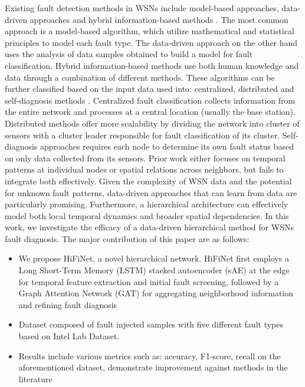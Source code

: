 Existing fault detection methods in WSNs include model-based approaches, data-driven approaches and hybrid information-based methods \cite{Shi2024}. The most common approach is a model-based algorithm, which utilize mathematical and statistical principles to model each fault type. The data-driven approach on the other hand uses the analysis of data samples obtained to build a model for fault classification. Hybrid information-based methods use both human knowledge and data through a combination of different methods. These algorithms can be further classified based on the input data used into: centralized, distributed and self-diagnosis methods \cite{Prasad2023, Takele2024}. Centralized fault classification collects information from the entire network and processes at a central location (usually the base station). Distributed methods offer more scalability by dividing the network into cluster of sensors with a cluster leader responsible for fault classification of its cluster. Self-diagnosis approaches requires each node to determine its own fault status based on only data collected from its sensors. Prior work either focuses on temporal patterns at individual nodes or spatial relations across neighbors, but fails to integrate both effectively. Given the complexity of WSN data and the potential for unknown fault patterns, data-driven approaches that can learn from data are particularly promising. Furthermore, a hierarchical architecture can effectively model both local temporal dynamics and broader spatial dependencies. In this work, we investigate the efficacy of a data-driven hierarchical method for WSNs fault diagnosis. The major contribution of this paper are as follows:

\begin{itemize} 
  \item We propose HiFiNet, a novel hierarchical network. HiFiNet first employs a Long Short-Term Memory (LSTM) stacked autoencoder (sAE) at the edge for temporal feature extraction and initial fault screening, followed by a Graph Attention Network (GAT) for aggregating neighborhood information and refining fault diagnosis
  \item Dataset composed of fault injected samples with five different fault types based on Intel Lab Dataset. 
  \item Results include various metrics such as: accuracy, F1-score, recall on the aforementioned dataset, demonstrate improvement against methods in the literature \end{itemize}
